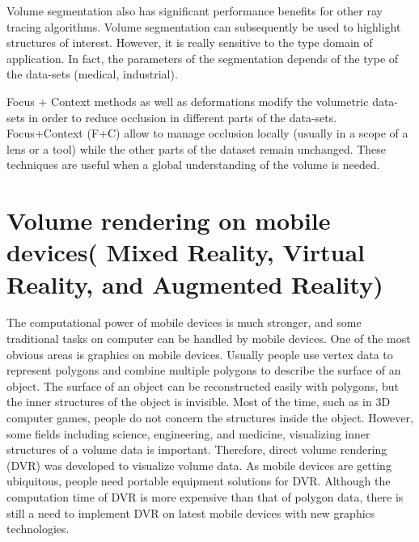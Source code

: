 Volume segmentation also has significant performance benefits for other ray tracing algorithms. Volume segmentation can subsequently be used to highlight structures of interest. However, it is really sensitive to the type domain of application. In fact, the parameters of the segmentation depends of the type of the data-sets (medical, industrial).  


Focus + Context methods as well as deformations modify the volumetric data-sets in order to reduce occlusion in different parts of the data-sets. Focus+Context (F+C) allow to manage occlusion locally (usually in a scope of a lens or a tool) while the other parts of the dataset remain unchanged. These techniques are useful when a global understanding of the volume is needed.

\section{Volume rendering on mobile devices( Mixed Reality, Virtual Reality, and Augmented Reality) }

The computational power of mobile devices is much 
stronger, and some traditional tasks on computer can be
handled by mobile devices. One of the most obvious areas is
graphics on mobile devices. Usually people use vertex data to
represent polygons and combine multiple polygons to describe
the surface of an object. The surface of an object can be
reconstructed easily with polygons, but the inner structures
of the object is invisible. Most of the time, such as in
3D computer games, people do not concern the structures
inside the object. However, some fields including science,
engineering, and medicine, visualizing inner structures of a
volume data is important. Therefore, direct volume rendering
(DVR) was developed to visualize volume data. As
mobile devices are getting ubiquitous, people need portable
equipment solutions for DVR. Although the computation time
of DVR is more expensive than that of polygon data, there is
still a need to implement DVR on latest mobile devices with
new graphics technologies.

